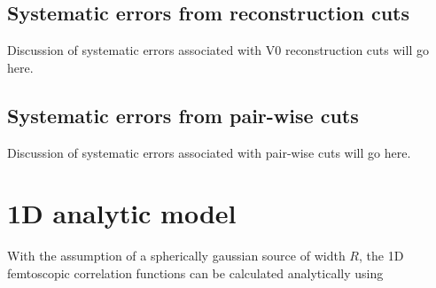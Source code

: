 \subsection{Systematic errors from reconstruction cuts}
\label{sec:SystematicsReconstruction}

Discussion of systematic errors associated with V0 reconstruction cuts will go here.

\subsection{Systematic errors from pair-wise cuts}
\label{sec:SystematicsPairWise}

Discussion of systematic errors associated with pair-wise cuts will go here.

\section{1D analytic model}
With the assumption of a spherically gaussian source of width $R$, the 1D femtoscopic correlation functions can be calculated analytically \cite{lednicky82} using 

